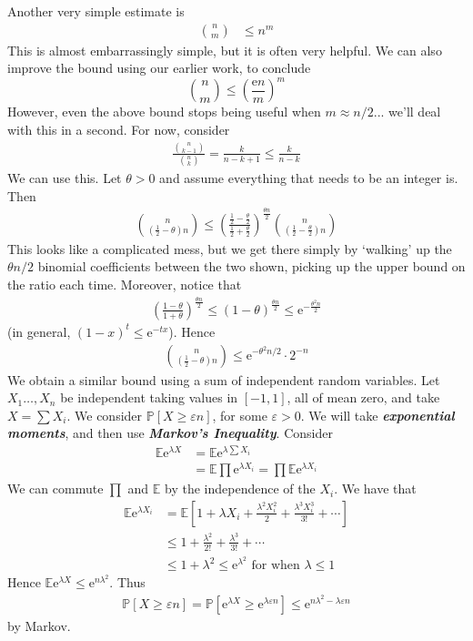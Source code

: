 \documentclass[]{article}
\theoremstyle{custhm}
\theoremstyle{cusdef}
\theoremstyle{custhm}
\theoremstyle{custhm}
\theoremstyle{custhm}
\theoremstyle{custhm}
\theoremstyle{cusdef}
\theoremstyle{remark}
\newcommand{\e}{\mathrm{e}}
\newcommand{\eps}{\varepsilon}
\newcommand{\E}{\mathbb{E}}
\renewcommand{\P}{\mathbb{P}}
\newcommand{\undf}[1]{\textit{\textbf{#1}}}
\begin{document}
Another very simple estimate is
\begin{align*}
\binom{n}{m}&\le n^m
\end{align*}
This is almost embarrassingly simple, but it is often very helpful. We can also improve the bound using our earlier work, to conclude
\[
\binom{n}{m} \le \left(\frac{\e n}{m}\right)^m
\]
However, even the above bound stops being useful when $m \approx n/2$... we'll deal with this in a second. For now, consider
\begin{align*}
\frac{\binom{n}{k-1}}{\binom{n}{k}} = \frac{k}{n-k+1}\le \frac{k}{n-k}
\end{align*}
We can use this. Let $\theta > 0$ and assume everything that needs to be an integer is. Then
\begin{align*}
\binom{n}{\left(\frac{1}{2} - \theta\right)n} \le \left(\frac{\frac{1}{2} - \frac{\theta}{2}}{\frac{1}{2}+\frac{\theta}{2}}\right)^{\frac{\theta n}{2}}\binom{n}{\left(\frac{1}{2} - \frac{\theta}{2}\right)n}
\end{align*}
This looks like a complicated mess, but we get there simply by `walking' up the $\theta n/2$ binomial coefficients between the two shown, picking up the upper bound on the ratio each time. Moreover, notice that
\begin{align*}
\left(\frac{1-\theta}{1+\theta}\right)^{\frac{\theta n}{2}} \le (1-\theta)^{\frac{\theta n}{2}} \le \e^{-\frac{\theta^2 n}{2}}
\end{align*}
(in general, $(1-x)^t \le \e^{-tx}$). Hence
\begin{align*}
\binom{n}{\left(\frac{1}{2}-\theta\right)n} \le \e^{-\theta^2 n/2}\cdot 2^{-n}
\end{align*}
We obtain a similar bound using a sum of independent random variables. Let $X_1\dots,X_n$ be independent taking values in $[-1,1]$, all of mean zero, and take $X = \sum X_i$. We consider $\P[X\ge \eps n]$, for some $\eps > 0$. We will take \undf{exponential moments}, and then use \undf{Markov's Inequality}. Consider
\begin{align*}
\E \e^{\lambda X} &= \E \e^{\lambda \sum X_i}\\
&=\E \prod \e^{\lambda X_i} = \prod \E\e^{\lambda X_i}
\end{align*}
We can commute $\prod$ and $\E$ by the independence of the $X_i$. We have that
\begin{align*}
\E \e^{\lambda X_i} &= \E\left[1 + \lambda X_i + \frac{\lambda^2X_i^2}{2} + \frac{\lambda^3X_i^3}{3!}+\cdots\right]\\
&\le 1 + \frac{\lambda^2}{2!} + \frac{\lambda^3}{3!}+\cdots\\
&\le 1 + \lambda^2 \le \e^{\lambda^2}\textrm{ for when }\lambda \le 1
\end{align*}
Hence $\E \e^{\lambda X} \le \e^{n\lambda^2}$. Thus
\begin{align*}
\P[X\ge \eps n] = \P[\e^{\lambda X}\ge \e^{\lambda \eps n}] \le \e^{n\lambda^2 - \lambda \eps n}
\end{align*}
by Markov.
\end{document}

